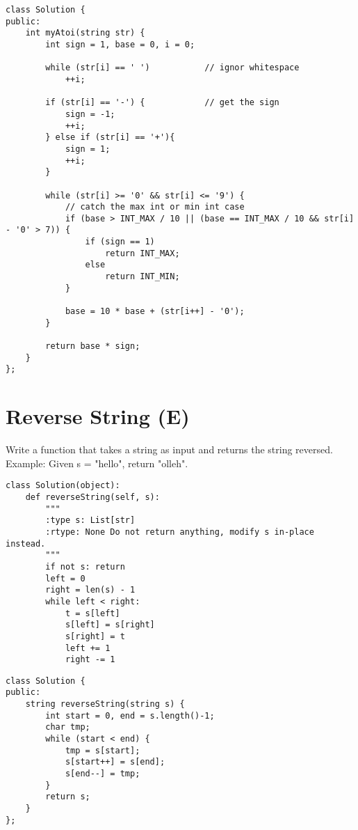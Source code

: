 \begin{lstlisting}
class Solution {
public:
    int myAtoi(string str) {
        int sign = 1, base = 0, i = 0;
        
        while (str[i] == ' ')           // ignor whitespace
            ++i;
        
        if (str[i] == '-') {            // get the sign
            sign = -1;
            ++i;
        } else if (str[i] == '+'){
            sign = 1;
            ++i;
        }
        
        while (str[i] >= '0' && str[i] <= '9') {
            // catch the max int or min int case
            if (base > INT_MAX / 10 || (base == INT_MAX / 10 && str[i] - '0' > 7)) {
                if (sign == 1) 
                    return INT_MAX;
                else 
                    return INT_MIN;
            }
            
            base = 10 * base + (str[i++] - '0');
        }
        
        return base * sign;
    }
};
\end{lstlisting}  


\section{Reverse String (E)}
Write a function that takes a string as input and returns the string reversed. \\

Example: Given s = "hello", return "olleh". \\

\begin{lstlisting}
class Solution(object):
    def reverseString(self, s):
        """
        :type s: List[str]
        :rtype: None Do not return anything, modify s in-place instead.
        """
        if not s: return
        left = 0
        right = len(s) - 1
        while left < right:
            t = s[left]
            s[left] = s[right]
            s[right] = t
            left += 1
            right -= 1
\end{lstlisting}

\begin{lstlisting}
class Solution {
public:
    string reverseString(string s) {
        int start = 0, end = s.length()-1;
        char tmp;
        while (start < end) {
            tmp = s[start];
            s[start++] = s[end];
            s[end--] = tmp;
        }
        return s;
    }
};
\end{lstlisting}

